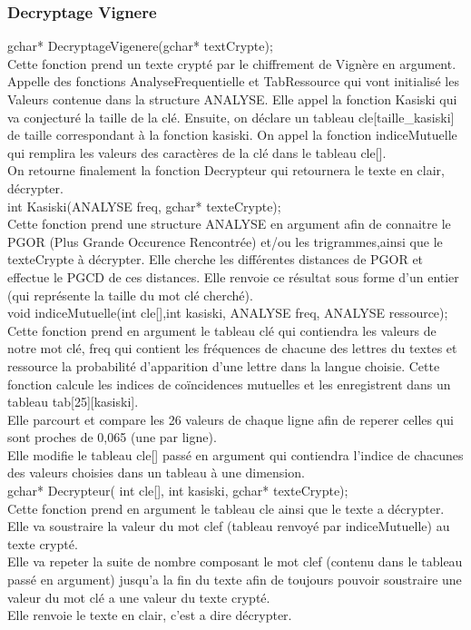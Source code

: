 \documentclass[a4]{article}
\begin{document}
	
	\subsubsection{Decryptage Vignere}
	gchar* DecryptageVigenere(gchar* textCrypte);\\
		Cette fonction prend un texte crypté par le chiffrement de Vignère en argument.
		Appelle des fonctions AnalyseFrequentielle et TabRessource qui vont initialisé les Valeurs 
		contenue dans la structure ANALYSE.
		Elle appel la fonction Kasiski qui va conjecturé la taille de la clé.
		Ensuite, on déclare un tableau cle[taille_kasiski] de taille correspondant à la fonction kasiski. 
		On appel la fonction indiceMutuelle qui remplira les valeurs des caractères de la clé dans le tableau cle[].\\
		On retourne finalement la fonction Decrypteur qui retournera le texte en clair, décrypter.\\
	
	int Kasiski(ANALYSE freq, gchar* texteCrypte);\\
		Cette fonction prend une structure ANALYSE en argument afin de connaitre le 
		PGOR (Plus Grande Occurence Rencontrée) et/ou les trigrammes,ainsi que le texteCrypte à décrypter.
		Elle cherche les différentes distances de PGOR et effectue le PGCD de ces distances.
		Elle renvoie ce résultat sous forme d'un entier (qui représente la taille du mot clé cherché).\\
	
	void indiceMutuelle(int cle[],int kasiski, ANALYSE freq, ANALYSE ressource);\\
		Cette fonction prend en argument le tableau clé qui contiendra les valeurs de notre mot clé,
		 freq qui contient les fréquences de chacune des lettres du textes et ressource la
		probabilité d'apparition d'une lettre dans la langue choisie.
		Cette fonction calcule les indices de coïncidences mutuelles et les enregistrent dans un tableau tab[25][kasiski].\\
		Elle parcourt et compare les 26 valeurs de chaque ligne afin de reperer celles qui sont proches de 0,065 (une par ligne).\\
		Elle modifie le tableau cle[] passé en argument qui contiendra l'indice de chacunes des valeurs choisies dans un tableau à une dimension. \\
	
	gchar* Decrypteur( int cle[], int kasiski, gchar* texteCrypte);\\
		Cette fonction prend en argument le tableau cle ainsi que le texte a décrypter.
		Elle va soustraire la valeur du mot clef (tableau renvoyé par indiceMutuelle) au texte crypté.\\
		Elle va repeter la suite de nombre composant le mot clef (contenu dans le tableau passé en argument) jusqu'a la fin du texte afin de toujours pouvoir
		soustraire une valeur du mot clé a une valeur du texte crypté.\\
		Elle renvoie le texte en clair, c'est a dire décrypter.\\
		
\end{document}

